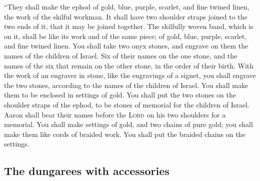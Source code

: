  ``They shall make the ephod of gold, blue, purple,
scarlet, and fine twined linen, the work of the skilful workman.
 It shall have two shoulder straps joined to the two ends
of it, that it may be joined together.  The skilfully
woven band, which is on it, shall be like its work and of the same
piece; of gold, blue, purple, scarlet, and fine twined linen.
 You shall take two onyx stones, and engrave on them the
names of the children of Israel.  Six of their names on
the one stone, and the names of the six that remain on the other stone,
in the order of their birth.  With the work of an
engraver in stone, like the engravings of a signet, you shall engrave
the two stones, according to the names of the children of Israel. You
shall make them to be enclosed in settings of gold.  You
shall put the two stones on the shoulder straps of the ephod, to be
stones of memorial for the children of Israel. Aaron shall bear their
names before the \textsc{Lord} on his two shoulders for a memorial.
 You shall make settings of gold,  and two
chains of pure gold; you shall make them like cords of braided work. You
shall put the braided chains on the settings.

\hypertarget{the-dungarees-with-accessories}{%
\subsection{The dungarees with
accessories}\label{the-dungarees-with-accessories}}

